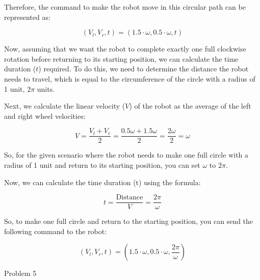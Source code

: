 \documentclass[answers]{exam}
\begin{document}
\begin{questions}
\begin{parts}
\begin{solution}
            Therefore, the command to make the robot move in this circular path can be represented as:

            \[(V_l, V_r, t) = (1.5\cdot\omega, 0.5\cdot\omega, t)\]

            Now, assuming that we want the robot to complete exactly one full clockwise rotation before returning to its starting position, we can calculate the time duration (\(t\)) required. To do this, we need to determine the distance the robot needs to travel, which is equal to the circumference of the circle with a radius of 1 unit, \(2\pi\) units.

            Next, we calculate the linear velocity (\(V\)) of the robot as the average of the left and right wheel velocities:

            \[V = \frac{V_l + V_r}{2} = \frac{0.5\omega + 1.5\omega}{2} = \frac{2\omega}{2} = \omega\]

            So, for the given scenario where the robot needs to make one full circle with a radius of 1 unit and return to its starting position, you can set \(\omega\) to \(2\pi\).

            Now, we can calculate the time duration (t) using the formula:

            \[t = \frac{\text{Distance}}{V} = \frac{2\pi}{\omega}\]

            So, to make one full circle and return to the starting position, you can send the following command to the robot:

            \[(V_l, V_r, t) = (1.5\cdot\omega, 0.5\cdot\omega, \frac{2\pi}{\omega})\]

        \end{solution}
    \end{parts}
    \question Problem 5

\end{questions}
\end{document}
